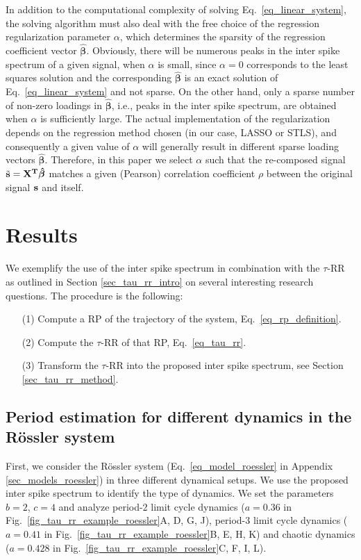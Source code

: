 \documentclass[entropy,article,submit,pdftex,moreauthors]{Definitions/mdpi}
\begin{document}
In addition to the computational complexity of solving Eq.~\eqref{eq_linear_system}, the solving algorithm must also deal with the free choice of the regression regularization parameter $\alpha$, 
which determines the sparsity of the regression coefficient vector $\hat{\boldsymbol\beta}$. Obviously, there will be numerous peaks in the inter spike spectrum of a given signal, when $\alpha$ is small, 
since $\alpha=0$ corresponds to the least squares solution and the corresponding $\hat{\boldsymbol\beta}$ is an exact solution of Eq.~\ref{eq_linear_system} and not sparse. On the other hand, 
only a sparse number of non-zero loadings in $\hat{\boldsymbol\beta}$, i.e., peaks in the inter spike spectrum, are obtained when $\alpha$ is sufficiently large. 
The actual implementation of the regularization depends on the regression method chosen (in our case, LASSO or STLS), and consequently a given value of $\alpha$ will generally result in 
different sparse loading vectors $\hat{\boldsymbol\beta}$. Therefore, in this paper we select $\alpha$ such that the re-composed signal $\tilde{\bf{s}}=\bf{X}^T\hat{\boldsymbol\beta}$ matches a 
given (Pearson) correlation coefficient $\rho$ between the original signal $\bf{s}$ and itself.

\section{Results}\label{sec_tau_rr_application}

We exemplify the use of the inter spike spectrum in combination with the $\tau$-RR as outlined in 
Section \ref{sec_tau_rr_intro} on several interesting research questions. The procedure is the following:
\begin{itemize}[noitemsep]
\item[(1)] Compute a RP of the trajectory of the system, Eq.~\eqref{eq_rp_definition}. 
\item[(2)] Compute the $\tau$-RR of that RP, Eq.~\eqref{eq_tau_rr}.
\item[(3)] Transform the $\tau$-RR into the proposed inter spike spectrum, see Section \ref{sec_tau_rr_method}.
\end{itemize}


\subsection{Period estimation for different dynamics in the R\"ossler system}
First, we consider the R\"ossler system (Eq.~\eqref{eq_model_roessler} in Appendix \ref{sec_models_roessler}) 
in three different dynamical setups. We use the proposed inter spike spectrum to
identify the type of dynamics.
We set the parameters $b=2$, $c=4$ and analyze period-2 limit cycle dynamics ($a=0.36$ in Fig.~\ref{fig_tau_rr_example_roessler}A, D, G, J), 
period-3 limit cycle dynamics ($a=0.41$ in Fig.~\ref{fig_tau_rr_example_roessler}B, E, H, K) and chaotic dynamics ($a=0.428$ in Fig.~\ref{fig_tau_rr_example_roessler}C, F, I, L).  
\end{document}
